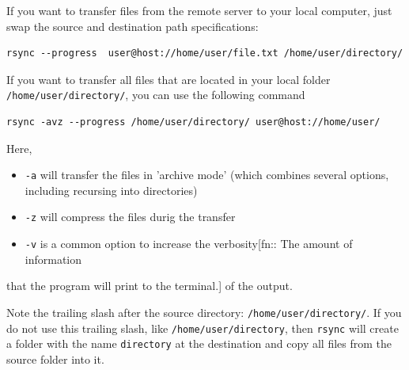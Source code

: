 \documentclass[11pt]{article}
\begin{document}
If you want to transfer files from the remote server to your
local computer, just swap the source and destination path
specifications:

\begin{verbatim}
rsync --progress  user@host://home/user/file.txt /home/user/directory/
\end{verbatim}

If you want to transfer all files that are located in your local
folder \texttt{/home/user/directory/}, you can use the following command

\begin{verbatim}
rsync -avz --progress /home/user/directory/ user@host://home/user/
\end{verbatim}

Here,
\begin{itemize}
\item \texttt{-a} will transfer the files in 'archive mode' (which combines
several options, including recursing into directories)
\item \texttt{-z} will compress the files durig the transfer
\item \texttt{-v} is a common option to increase the verbosity[fn:: The amount of information
\end{itemize}
that the program will print to the terminal.] of the output.

Note the trailing slash after the source directory:
\texttt{/home/user/directory/}. If you do not use this trailing slash, like
\texttt{/home/user/directory}, then \texttt{rsync} will create a folder with the
name \texttt{directory} at the destination and copy all files from the source
folder into it.
\end{document}
